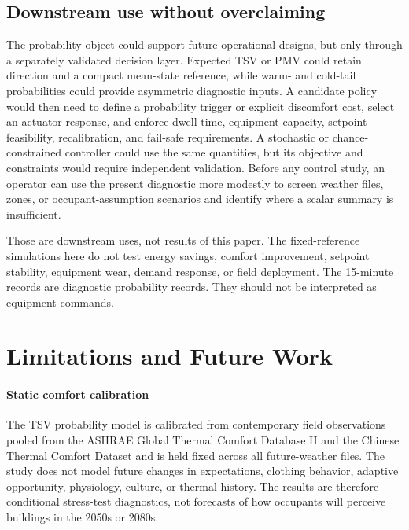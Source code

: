 \subsection{Downstream use without overclaiming}

The probability object could support future operational designs, but only through a separately validated decision layer. Expected TSV or PMV could retain direction and a compact mean-state reference, while warm- and cold-tail probabilities could provide asymmetric diagnostic inputs. A candidate policy would then need to define a probability trigger or explicit discomfort cost, select an actuator response, and enforce dwell time, equipment capacity, setpoint feasibility, recalibration, and fail-safe requirements. A stochastic or chance-constrained controller could use the same quantities, but its objective and constraints would require independent validation. Before any control study, an operator can use the present diagnostic more modestly to screen weather files, zones, or occupant-assumption scenarios and identify where a scalar summary is insufficient.

Those are downstream uses, not results of this paper. The fixed-reference simulations here do not test energy savings, comfort improvement, setpoint stability, equipment wear, demand response, or field deployment. The 15-minute records are diagnostic probability records. They should not be interpreted as equipment commands.

\section{Limitations and Future Work}\label{sec:limitations}

\paragraph{Static comfort calibration}
The TSV probability model is calibrated from contemporary field observations pooled from the ASHRAE Global Thermal Comfort Database II and the Chinese Thermal Comfort Dataset and is held fixed across all future-weather files. The study does not model future changes in expectations, clothing behavior, adaptive opportunity, physiology, culture, or thermal history. The results are therefore conditional stress-test diagnostics, not forecasts of how occupants will perceive buildings in the 2050s or 2080s.

